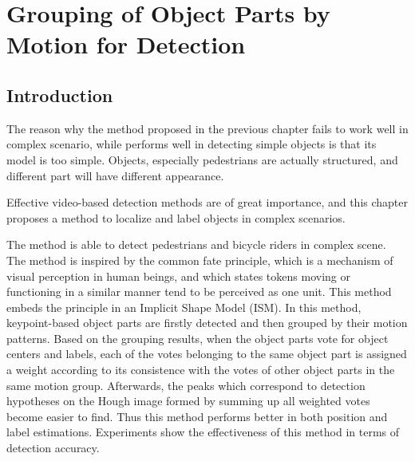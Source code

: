\chapter{Grouping of Object Parts by Motion for Detection}
\label{chp4}
\section{Introduction}

The reason why the method proposed in the previous chapter fails to work well in complex scenario, while performs well in detecting simple objects is that its model is too simple. Objects, especially pedestrians are actually structured, and different part will have different appearance.

Effective video-based detection methods are of great importance, and this chapter proposes a method to localize and label objects in complex scenarios.

The method is able to detect pedestrians and bicycle riders in complex scene. The method is inspired by the common fate principle, which is a mechanism of visual perception in human beings, and which states  tokens moving or functioning in a similar manner tend to be  perceived
as one unit. This method embeds the principle in an Implicit Shape Model (ISM). In this method, keypoint-based
object parts are firstly detected and then grouped by their motion patterns. Based on the grouping results, when the object parts vote for object centers and labels, each of the votes belonging to the same object part is assigned a weight according to its consistence with the votes of other object parts in the same motion group. Afterwards, the peaks which correspond to detection hypotheses on the Hough image formed by summing up all weighted votes become easier to find. Thus this method  performs better in both position and label estimations. Experiments show the effectiveness of this method in terms of detection accuracy.





